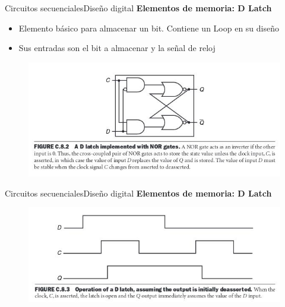 \documentclass[aspectratio=169,compress]{beamer}
\begin{document}
\begin{footnotesize}
\begin{frame}{Circuitos secuenciales}{Diseño digital}
\bigskip
\textbf{Elementos de memoria: D Latch}
\begin{itemize}
\item Elemento básico para almacenar un bit. Contiene un Loop en su diseño
\item Sus entradas son el bit a almacenar y la señal de reloj
\end{itemize}
\bigskip
\begin{figure}
\includegraphics[scale=0.4]{images/latch-d.jpg} 
\end{figure}
\end{frame}


\begin{frame}{Circuitos secuenciales}{Diseño digital}
\bigskip
\textbf{Elementos de memoria: D Latch}
\bigskip
\begin{figure}
\includegraphics[scale=0.4]{images/latch-d-tiempo.jpg} 
\end{figure}
\end{frame}



\end{footnotesize}
\end{document}
